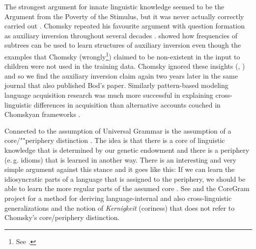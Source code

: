 The strongest argument for innate linguistic knowledge seemed to be the Argument from the Poverty of the Stimulus, but
it was never actually correctly carried out \citep{PS2002a,SP2002b}. Chomsky repeated his favourite argument
with question formation as auxiliary inversion throughout several decades \parencites[--33]{Chomsky71a-u}[]{Chomsky2013a}. \citet{Bod2009a} showed
how frequencies of subtrees can be used to learn structures of auxiliary inversion even though the
examples that Chomsky (wrongly\footnote{%
See \citet[--45]{PS2002a}.
}) claimed to be non-existent in the input to children were not used in the training data. Chomsky
ignored these insights (\citealt*{BPYC2011a}, \citealt[]{Chomsky2013a}) and so we 
find the auxiliary inversion claim again two years later in the same journal that also published Bod's paper.
Similarly pattern-based modeling language acquisition research was much more successful in explaining
cross-linguistic differences in acquisition than alternative accounts couched in Chomskyan
frameworks \citep{FPG2006a,FPAG2007a,FPG2009a}.


Connected to the assumption of Universal Grammar is the assumption of a core/""periphery
distinction \parencites[--8]{Chomsky81a}[--151]{Chomsky86a}[]{Fodor98a}. The idea is that there is a core of linguistic knowledge that is determined by our
genetic endowment and there is a periphery (e.\,g. idioms) that is learned in another way. There is an interesting and very
simple argument against this stance and it goes like this: If we can learn the idiosyncratic parts of a language that is
assigned to the periphery, we should be able to learn the more regular parts of the assumed core
\parencites[]{Abney96a}[]{Goldberg2003b}[]{Goldberg2006a}[]{Newmeyer2005a}[]{Tomasello2006a}[]{Tomasello2006c}{MuellerKernigkeit}. 
See  and the CoreGram project \citep{MuellerCoreGram}
for a method for deriving language-internal and also cross-linguistic generalizations and the notion
of \emph{Kernigkeit} (coriness) that does not refer to Chomsky's core/periphery distinction. 


